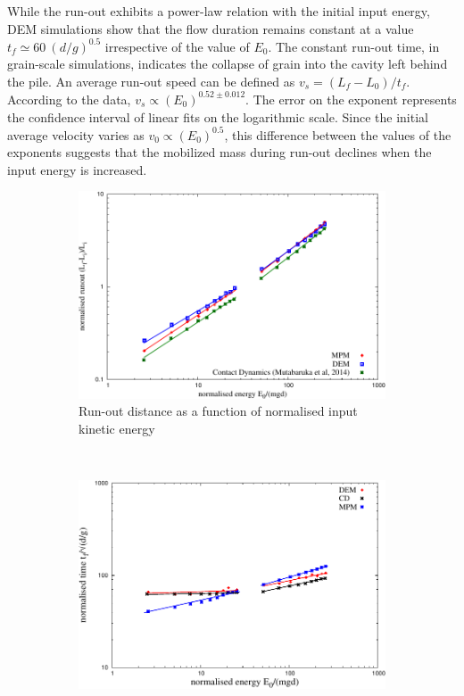While the run-out exhibits a power-law relation with the initial input energy, 
DEM simulations show that the flow duration remains constant at a value  $t_f 
\simeq 60 \  (d/g)^{0.5}$ irrespective of the value of $E_0$. The constant 
run-out time, in grain-scale simulations, indicates the collapse of grain into 
the cavity left behind the pile. An average run-out speed can be defined as 
$v_s = (L_f - L_0) / t_f$. According to the data, $v_s \propto 
(E_0)^{0.52\pm 0.012}$. The error on the exponent represents the 
confidence interval of linear fits on the logarithmic scale. Since the initial 
average velocity varies as $v_0 \propto (E_0)^{0.5}$, this difference between 
the values of the exponents suggests that the mobilized mass during run-out 
declines when the input energy is increased.


\begin{figure}[tbph]
\centering
\begin{subfigure}[b]{0.975\textwidth}
\centering
\includegraphics[width=\textwidth]{Runout_Eo_MPM_CD_DEM}
\caption{Run-out distance as a function of normalised input kinetic energy}
\label{fig:Runout_Eo_MPM_CD_DEM}
\end{subfigure}
\\
\begin{subfigure}[b]{0.975\textwidth}
\centering
\includegraphics[width=\textwidth]{Tf_vs_Eo_Slope}

\end{subfigure}
\end{figure}
